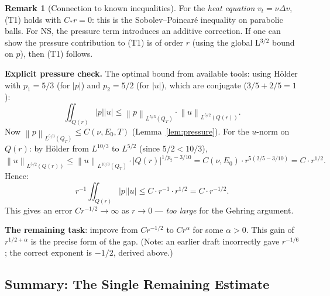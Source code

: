 \documentclass[11pt]{article}
\theoremstyle{definition}
\newtheorem{remark}[theorem]{Remark}
\theoremstyle{remark}
\newcommand{\norm}[1]{\left\|#1\right\|}
\begin{document}
\begin{remark}[Connection to known inequalities]
  For the \emph{heat equation} $v_t=\nu\Delta v$, (T1) holds with $C_*r=0$:
  this is the Sobolev--Poincar\'e inequality on parabolic balls.
  For NS, the pressure term introduces an additive correction.
  If one can show the pressure contribution to (T1) is of order $r$
  (using the global L$^{3/2}$ bound on $p$), then (T1) follows.

  \medskip
  \noindent\textbf{Explicit pressure check.}
  The optimal bound from available tools:
  using H\"older with $p_1=5/3$ (for $|p|$) and $p_2=5/2$ (for $|u|$),
  which are conjugate ($3/5+2/5=1$):
  \[
    \iint_{Q(r)}|p||u|
    \leq \norm{p}_{L^{5/3}(Q_T)}\cdot\norm{u}_{L^{5/2}(Q(r))}.
  \]
  Now $\norm{p}_{L^{5/3}(Q_T)}\leq C(\nu,E_0,T)$ (Lemma~\ref{lem:pressure}).
  For the $u$-norm on $Q(r)$: by H\"older from $L^{10/3}$ to $L^{5/2}$
  (since $5/2 < 10/3$),
  \[
    \norm{u}_{L^{5/2}(Q(r))}
    \leq \norm{u}_{L^{10/3}(Q_T)}\cdot|Q(r)|^{1/p_2-3/10}
    = C(\nu,E_0)\cdot r^{5(2/5-3/10)}
    = C\cdot r^{1/2}.
  \]
  Hence:
  \[
    r^{-1}\iint_{Q(r)}|p||u| \leq C\cdot r^{-1}\cdot r^{1/2} = C\cdot r^{-1/2}.
  \]
  This gives an error $Cr^{-1/2}\to\infty$ as $r\to 0$ --- \emph{too large}
  for the Gehring argument.

  \noindent\textbf{The remaining task}: improve from $Cr^{-1/2}$ to $Cr^\alpha$
  for some $\alpha>0$.  This gain of $r^{1/2+\alpha}$ is the precise form
  of the gap.  (Note: an earlier draft incorrectly gave $r^{-1/6}$;
  the correct exponent is $-1/2$, derived above.)
\end{remark}

\subsection{Summary: The Single Remaining Estimate}

\begin{center}
\end{center}
\end{document}
